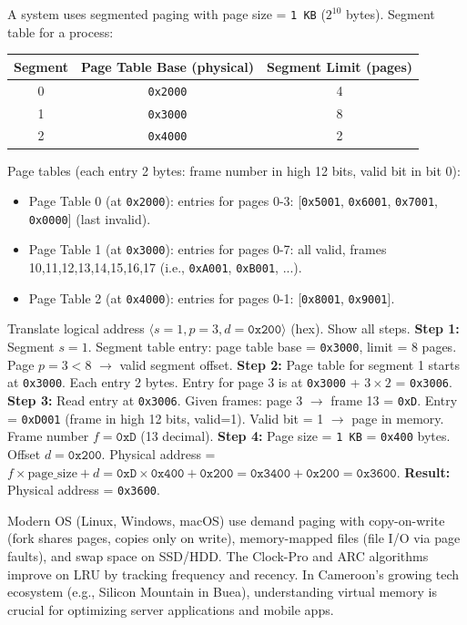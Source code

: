 \documentclass[11pt]{article}
\newcommand{\cle}[1]{{\popxbold\color{popdark}#1}}
\begin{document}
\begin{exoresolu}
A system uses segmented paging with page size = \texttt{1 KB} ($2^{10}$ bytes). Segment table for a process:
\begin{center}
\begin{tabular}{|c|c|c|}\hline
Segment & Page Table Base (physical) & Segment Limit (pages) \\ \hline
0 & \texttt{0x2000} & 4 \\
1 & \texttt{0x3000} & 8 \\
2 & \texttt{0x4000} & 2 \\ \hline
\end{tabular}
\end{center}
Page tables (each entry 2 bytes: frame number in high 12 bits, valid bit in bit 0):
\begin{itemize}
\item Page Table 0 (at \texttt{0x2000}): entries for pages 0-3: [\texttt{0x5001}, \texttt{0x6001}, \texttt{0x7001}, \texttt{0x0000}] (last invalid).
\item Page Table 1 (at \texttt{0x3000}): entries for pages 0-7: all valid, frames 10,11,12,13,14,15,16,17 (i.e., \texttt{0xA001}, \texttt{0xB001}, ...).
\item Page Table 2 (at \texttt{0x4000}): entries for pages 0-1: [\texttt{0x8001}, \texttt{0x9001}].
\end{itemize}
Translate logical address $\langle s=1, p=3, d=\texttt{0x200} \rangle$ (hex). Show all steps.
\tcblower
\textbf{Step 1:} Segment $s=1$. Segment table entry: page table base = \texttt{0x3000}, limit = 8 pages. Page $p=3 < 8$ $\rightarrow$ valid segment offset.
\textbf{Step 2:} Page table for segment 1 starts at \texttt{0x3000}. Each entry 2 bytes. Entry for page 3 is at \texttt{0x3000} + $3 \times 2$ = \texttt{0x3006}.
\textbf{Step 3:} Read entry at \texttt{0x3006}. Given frames: page 3 $\rightarrow$ frame 13 = \texttt{0xD}. Entry = \texttt{0xD001} (frame in high 12 bits, valid=1). Valid bit = 1 $\rightarrow$ page in memory. Frame number $f = \texttt{0xD}$ (13 decimal).
\textbf{Step 4:} Page size = \texttt{1 KB} = \texttt{0x400} bytes. Offset $d = \texttt{0x200}$.
Physical address = $f \times \text{page\_size} + d = \texttt{0xD} \times \texttt{0x400} + \texttt{0x200} = \texttt{0x3400} + \texttt{0x200} = \texttt{0x3600}$.
\textbf{Result:} Physical address = \texttt{0x3600}.
\end{exoresolu}

\begin{savaistu}
Modern OS (Linux, Windows, macOS) use \cle{demand paging} with \cle{copy-on-write} (fork shares pages, copies only on write), \cle{memory-mapped files} (file I/O via page faults), and \cle{swap space} on SSD/HDD. The \cle{Clock-Pro} and \cle{ARC} algorithms improve on LRU by tracking frequency and recency. In Cameroon's growing tech ecosystem (e.g., Silicon Mountain in Buea), understanding virtual memory is crucial for optimizing server applications and mobile apps.
\end{savaistu}
\end{document}
